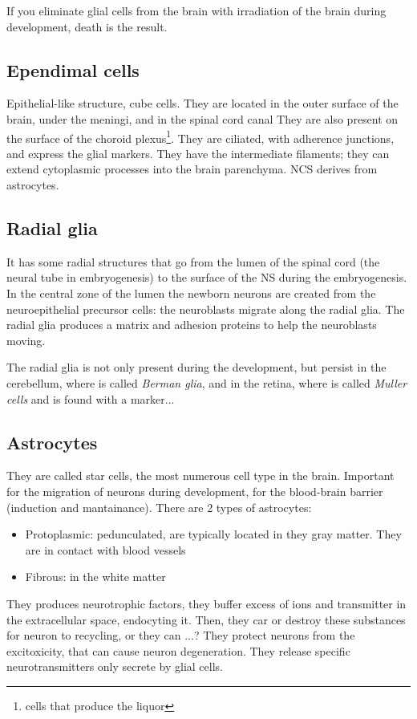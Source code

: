 \documentclass[a4paper, 12pt]{book}
\begin{document}
If you eliminate glial cells from the brain with irradiation of the brain during development, death is the result.

\subsection{Ependimal cells}
Epithelial-like structure, cube cells. They are located in the outer surface of the brain, under the meningi, and in the spinal cord canal They are also present on the surface of the choroid plexus\footnote{cells that produce the liquor}.  They are ciliated, with adherence junctions, and express the glial markers. They have the intermediate filaments; they can extend cytoplasmic processes into the brain parenchyma. NCS derives from astrocytes.

\subsection{Radial glia}
It has some radial structures that go from the lumen of the spinal cord (the neural tube in embryogenesis) to the surface of the NS during the embryogenesis. In the central zone of the lumen the newborn neurons are created from the neuroepithelial precursor cells: the neuroblasts migrate along the radial glia. The radial glia produces a matrix and adhesion proteins to help the neuroblasts moving. 

The radial glia is not only present during the development, but persist in the cerebellum, where is called \emph{Berman glia}, and in the retina, where is called \emph{Muller cells} and is found with a marker...

\subsection{Astrocytes}
They are called star cells, the most numerous cell type in the brain. Important for the migration of neurons during development, for the blood-brain barrier (induction and mantainance). 
There are 2 types of astrocytes:
\begin{itemize}
\item{Protoplasmic: pedunculated, are typically located in they gray matter. They are in contact with blood vessels}
\item{Fibrous: in the white matter}
\end{itemize}

They produces neurotrophic factors, they buffer excess of ions and transmitter in the extracellular space, endocyting it. Then, they car or destroy these substances for neuron to recycling, or they can ...?
They protect neurons from the excitoxicity, that can cause neuron degeneration. They release specific neurotransmitters only secrete by glial cells.
\end{document}
